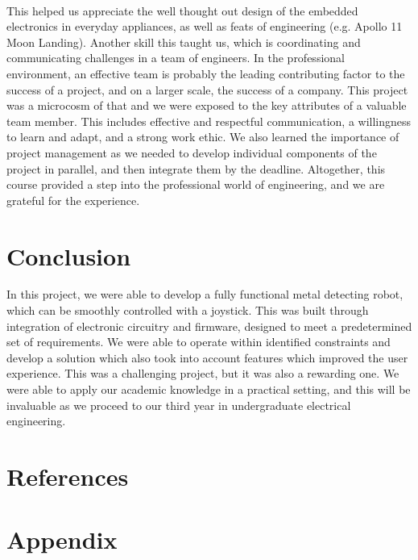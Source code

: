 \documentclass{article}
\begin{document}
\

This helped us appreciate the well thought out design of the embedded electronics in everyday appliances, as well as feats of engineering (e.g. Apollo 11 Moon Landing). Another skill this taught us, which
is coordinating and communicating challenges in a team of engineers. In the professional environment, an effective team is probably the leading contributing factor to the success of a project, and
on a larger scale, the success of a company. This project was a microcosm of that and we were exposed to the key attributes of a valuable team member. This includes effective and respectful communication,
a willingness to learn and adapt, and a strong work ethic. We also learned the importance of project management as we needed to develop individual components of the project in parallel, and then integrate them
by the deadline. Altogether, this course provided a step into the professional world of engineering, and we are grateful for the experience.


\section{Conclusion}

In this project, we were able to develop a fully functional metal detecting robot, which can be smoothly controlled with a joystick. This was built through integration of electronic circuitry and firmware, designed
to meet a predetermined set of requirements. We were able to operate within identified constraints and develop a solution which also took into account features which
improved the user experience. This was a challenging project, but it was also a rewarding one. We were able to apply our academic knowledge in a practical setting, and
this will be invaluable as we proceed to our third year in undergraduate electrical engineering.

\renewcommand{\refname}{}

\newpage

\section{References}
\begin{thebibliography}{10}


\end{thebibliography}

\clearpage
\section{Appendix}
\end{document}
